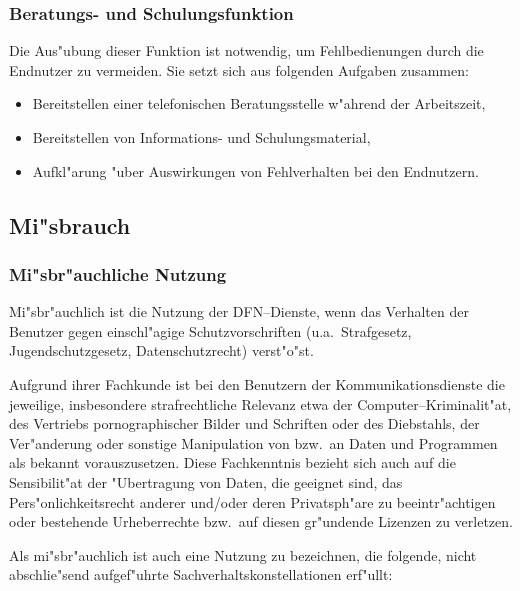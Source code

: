 \documentclass[12pt,titlepage,twoside]{scrartcl}
\begin{document}
\begin{appendix}
\subsubsection{Beratungs- und Schulungsfunktion}

Die Aus"ubung dieser Funktion ist notwendig, um Fehlbedienungen durch die
Endnutzer zu vermeiden. Sie setzt sich aus folgenden Aufgaben zusammen:

\begin{itemize}
  \item Bereitstellen einer telefonischen Beratungsstelle w"ahrend der
    Arbeitszeit,
  \item Bereitstellen von Informations- und Schulungsmaterial,
  \item Aufkl"arung "uber Auswirkungen von Fehlverhalten bei den Endnutzern.
\end{itemize}

\subsection{Mi"sbrauch}

\subsubsection{Mi"sbr"auchliche Nutzung}

Mi"sbr"auchlich ist die Nutzung der DFN--Dienste, wenn das Verhalten der
Benutzer gegen einschl"agige Schutzvorschriften (u.a.\  Strafgesetz,
Jugendschutzgesetz, Datenschutzrecht) verst"o"st.

Aufgrund ihrer Fachkunde ist bei den Benutzern der Kommunikationsdienste die
jeweilige, insbesondere strafrechtliche Relevanz etwa der
Computer--Kriminalit"at, des Vertriebs pornographischer Bilder und Schriften
oder des Diebstahls, der Ver"anderung oder sonstige Manipulation von bzw.\  an
Daten und Programmen als bekannt vorauszusetzen. Diese Fachkenntnis bezieht
sich auch auf die Sensibilit"at der "Ubertragung von Daten, die geeignet sind,
das Pers"onlichkeitsrecht anderer und/oder deren Privatsph"are zu
beeintr"achtigen oder bestehende Urheberrechte bzw.\  auf diesen gr"undende
Lizenzen zu verletzen.

Als mi"sbr"auchlich ist auch eine Nutzung zu bezeichnen, die folgende, nicht
abschlie"send aufgef"uhrte Sachverhaltskonstellationen erf"ullt:


\end{appendix}
\end{document}
